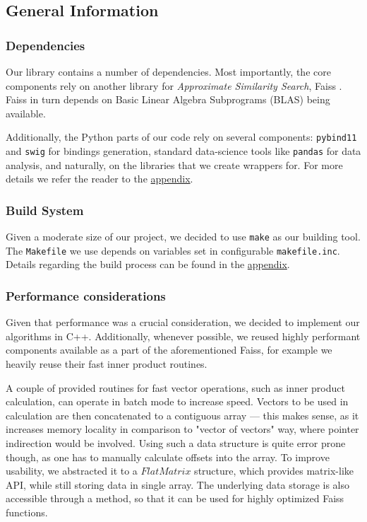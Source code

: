
\subsection{General Information}


\subsubsection{Dependencies}

Our library contains a number of dependencies. Most importantly, the core components rely on 
another library for \textit{Approximate Similarity Search}, Faiss \cite{faiss}.
Faiss in turn depends on Basic Linear Algebra Subprograms (BLAS) being available.

Additionally, the Python parts of our code rely on several components: \texttt{pybind11} and \texttt{swig}
for bindings generation, standard data-science tools like \texttt{pandas} for data analysis, and naturally, on the
libraries that we create wrappers for. For more details we refer the reader to the \hyperref[sec:appendices]{appendix}.

\subsubsection{Build System}

Given a moderate size of our project, we decided to use \texttt{make} as our building tool. The \texttt{Makefile} we use
depends on variables set in configurable \texttt{makefile.inc}. Details regarding the build process can be found in the \hyperref[sec:appendices]{appendix}.

\subsubsection{Performance considerations}

Given that performance was a crucial consideration, we decided to implement our algorithms in C++.
Additionally, whenever possible, we reused highly performant components available as a part of the aforementioned Faiss,
for example we heavily reuse their fast inner product routines. 

A couple of provided routines for fast vector operations, such as inner product calculation, can
operate in batch mode to increase speed. Vectors to be used in calculation are then concatenated
to a contiguous array --- this makes sense, as it increases memory locality in comparison
to "vector of vectors" way, where pointer indirection would be involved. Using such a data structure
is quite error prone though, as one has to manually calculate offsets into the array. To improve
usability, we abstracted it to a $FlatMatrix$ structure, which provides matrix-like API, while
still storing data in single array. The underlying data storage is also accessible through a method,
so that it can be used for highly optimized Faiss functions.

